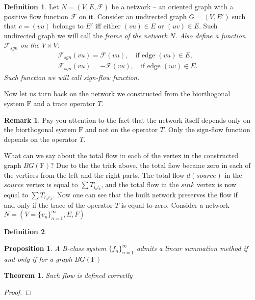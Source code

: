 \documentclass[12pt]{article}
\newtheorem{theorem}{Theorem}
\newtheorem{prop}{Proposition}
\theoremstyle{definition}
\newtheorem{remark}{Remark}
\newtheorem{definition}{Definition}
\newcommand{\seq}[1]{\{{#1}_n\}_{n=1}^\infty}
\newcommand{\fsys}{\mathrm{F}}
\newcommand{\flow}{\mathcal{F}}
\newcommand{\flowsgn}{\mathcal{F}_{sgn}}
\newcommand{\source}{\mathit{source}}
\newcommand{\sink}{\mathit{sink}}
\numberwithin{remark}{section}
\numberwithin{theorem}{section}
\numberwithin{prop}{section}
\numberwithin{equation}{section}
\numberwithin{lemma}{section}
\numberwithin{prop_under_lemma}{lemma}
\begin{document}
    \begin{definition}
      Let $N=(V,E,\flow)$ be a network -- an oriented graph with a positive flow function $\flow$ on it.
      Consider an undirected graph $G=(V,E')$ such that $e=(vu)$ belongs to $E'$ iff
      either $(vu) \in E$ or $(uv) \in E$.
      Such undirected graph we will call the \it{frame} of the network $N$.
      Also define a function $\flowsgn$ on the $V \times V$:
      \begin{align*}
        \flowsgn(vu) = \flow(vu), \quad \text{if edge } (vu) \in E,\\
        \flowsgn(vu) = -\flow(vu), \quad \text{if edge } (uv) \in E.
      \end{align*}
      Such function we will call \it{sign-flow} function.
    \end{definition}
    Now let us turn back on the network we constructed from the biorthogonal system $\fsys$ and
    a trace operator $T$.
    \begin{remark}
      Pay you attention to the fact that the network itself
      depends only on the biorthogonal system $\fsys$ and not on the operator $T$.
      Only the sign-flow function depends on the operator $T$.
    \end{remark}
    What can we say about the total flow in each of the vertex in the constructed graph $BG(\fsys)$?
    Due to the the trick above, the total flow became zero in each of the vertices from the left and the right parts.
    The total flow $d(\source)$ in the $\source$ vertex is equal to $\sum T_{l_k l_k}$, and the total flow in the
    $\sink$ vertex is now equal to $\sum T_{r_k r_k}$.
    Now one can see that the built network preserves the flow if and only if the trace of the operator $T$ is equal to
    zero.
      Consider a network $N = (V = \seq{v}, E, F)$
    \begin{definition}
    \end{definition}

    
    \begin{prop}
        A B-class system $\seq{f}$ admits a linear summation method if and only if for a graph $BG(\fsys)$
    \end{prop}
    
    \begin{theorem}
        Such flow is defined correctly 
    \end{theorem}
    \begin{proof}
        
    \end{proof}
\end{document}

